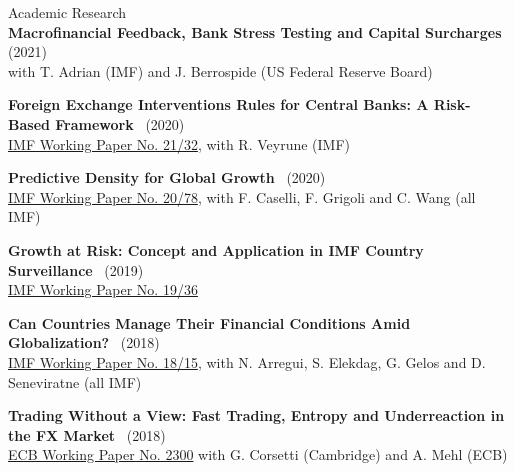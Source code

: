 \documentclass[usegeometry, 10pt, a4paper]{cv} %
\newcommand{\activite}[1]{\textbf{#1}\ }
\begin{document}
\begin{rubriquetableau}[0.95\textwidth]{Academic Research}\\

\activite{Macrofinancial Feedback, Bank Stress Testing and Capital Surcharges} (2021) \\
\hspace{0.6cm} \small{with T. Adrian (IMF) and J. Berrospide (US Federal Reserve Board)}
\vspace{0.4cm} 
  
\activite{Foreign Exchange Interventions Rules for Central Banks: A Risk-Based Framework} (2020) \\
\hspace{0.6cm} \small{\href{https://www.imf.org/en/Publications/WP/Issues/2021/02/12/Foreign-Exchange-Intervention-Rules-for-Central-Banks-A-Risk-based-Framework-50081}{IMF Working Paper No. 21/32}, with R. Veyrune (IMF)}
\vspace{0.4cm} 
  

\activite{Predictive Density for Global Growth} (2020) \\
\hspace{0.6cm} \small{\href{https://www.imf.org/en/Publications/WP/Issues/2020/05/29/Predictive-Density-Aggregation-A-Model-for-Global-GDP-Growth-49441}{IMF Working Paper No. 20/78}, with F. Caselli, F. Grigoli and C. Wang (all IMF)}
\vspace{0.4cm} 

  
\activite{Growth at Risk: Concept and Application in IMF Country Surveillance} (2019) \\
\hspace{0.6cm} \small{\href{https://www.imf.org/en/Publications/WP/Issues/2019/02/21/Growth-at-Risk-Concept-and-Application-in-IMF-Country-Surveillance-46567}{IMF Working Paper No. 19/36}}
\vspace{0.4cm} 

\activite{Can Countries Manage Their Financial Conditions Amid Globalization?} (2018) \\
\hspace{0.6cm} \small{\href{https://www.imf.org/en/Publications/WP/Issues/2018/01/24/Can-Countries-Manage-Their-Financial-Conditions-Amid-Globalization-45581}{IMF Working Paper No. 18/15}, with N. Arregui, S. Elekdag, G. Gelos and D. Seneviratne (all IMF)}
\vspace{0.4cm} 

\activite{Trading Without a View: Fast Trading, Entropy and Underreaction in the FX  Market} (2018) \\
\hspace{0.6cm}
\small{\href{https://www.ecb.europa.eu/pub/pdf/scpwps/ecb.wp2300~68bda93b78.en.pdf}{ECB
    Working Paper No. 2300} with G. Corsetti (Cambridge) and A. Mehl (ECB)}
\vspace{0.4cm} 



\end{rubriquetableau}
\end{document}
